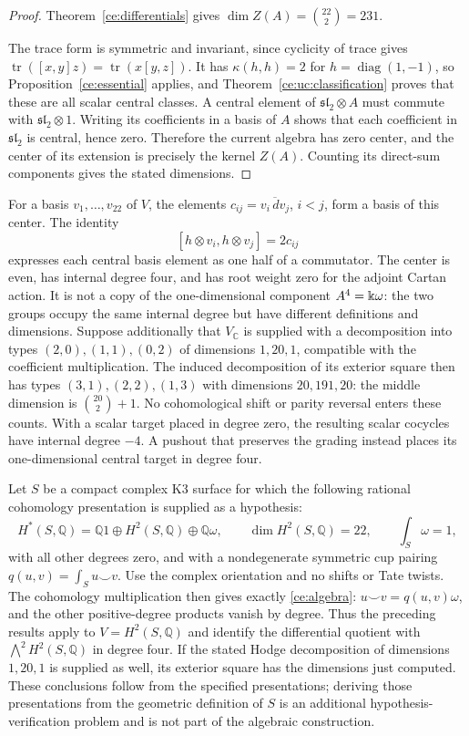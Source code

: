 \begin{proof}
Theorem~\ref{ce:differentials} gives
$\dim Z(A)=\binom{22}{2}=231$.

The trace form is symmetric and invariant, since cyclicity of trace
gives $\operatorname{tr}([x,y]z)=\operatorname{tr}(x[y,z])$.
It has $\kappa(h,h)=2$ for $h=\operatorname{diag}(1,-1)$, so
Proposition~\ref{ce:essential} applies, and
Theorem~\ref{ce:uc:classification} proves that these are all scalar
central classes.  A central element of
$\mathfrak{sl}_2\otimes A$ must commute with $\mathfrak{sl}_2\otimes1$.
Writing its coefficients in a basis of $A$ shows that each coefficient
in $\mathfrak{sl}_2$ is central, hence zero.  Therefore the current
algebra has zero center, and the center of its extension is precisely
the kernel $Z(A)$.  Counting its direct-sum components gives the stated
dimensions.
\end{proof}

For a basis $v_1,\ldots,v_{22}$ of $V$, the elements
$c_{ij}=\overline{v_i\,dv_j}$, $i<j$, form a basis of this center.
The identity
\[
 [h\otimes v_i,h\otimes v_j]=2c_{ij}
\]
expresses each central basis element as one half of a commutator.  The
center is even, has
internal degree four, and has root weight zero for the adjoint Cartan
action.  It is not a copy of the one-dimensional component $A^4=\Bbbk\omega$:
the two groups occupy the same internal degree but have different
definitions and dimensions.  Suppose additionally that $V_{\mathbb C}$
is supplied with a decomposition into types $(2,0),(1,1),(0,2)$ of
dimensions $1,20,1$, compatible with the coefficient multiplication.
The induced decomposition of its exterior square then has types
$(3,1),(2,2),(1,3)$ with dimensions $20,191,20$: the middle dimension
is $\binom{20}{2}+1$.
No cohomological shift or parity reversal enters these counts.  With a
scalar target placed in degree zero, the resulting scalar cocycles have
internal degree $-4$.  A pushout that preserves the grading instead
places its one-dimensional central target in degree four.

\begin{example}
Let $S$ be a compact complex K3 surface for which the following rational
cohomology presentation is supplied as a hypothesis:
\[
 H^*(S,\mathbb Q)=\mathbb Q1\oplus H^2(S,\mathbb Q)\oplus\mathbb Q\omega,
 \qquad \dim H^2(S,\mathbb Q)=22,\qquad \int_S\omega=1,
\]
with all other degrees zero, and with a nondegenerate symmetric cup
pairing $q(u,v)=\int_Su\smile v$.  Use the complex orientation and no
shifts or Tate twists.  The cohomology multiplication then gives exactly
\eqref{ce:algebra}: $u\smile v=q(u,v)\omega$, and the other
positive-degree products vanish by degree.  Thus the preceding results
apply to $V=H^2(S,\mathbb Q)$ and identify the differential quotient
with $\bigwedge^2H^2(S,\mathbb Q)$ in degree four.  If the stated Hodge
decomposition of dimensions $1,20,1$ is supplied as well, its exterior
square has the dimensions just computed.  These conclusions follow from
the specified presentations; deriving those presentations from the
geometric definition of $S$ is an additional hypothesis-verification
problem and is not part of the algebraic construction.
\end{example}

